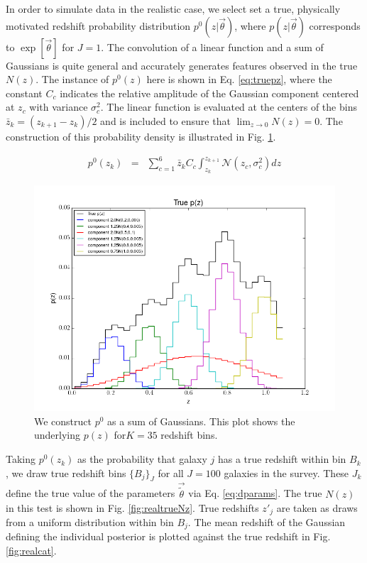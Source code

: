 \documentclass[preprint]{aastex}
\begin{document}
In order to simulate data in the realistic case, we select set a true, physically motivated redshift probability distribution $p^{0}(z|\vec{\theta})$, where $p(z|\vec{\theta})$ corresponds to $\exp[\vec{\theta}]$ for $J=1$.  The convolution of a linear function and a sum of Gaussians is quite general and accurately generates features observed in the true $N(z)$.  The instance of $p^{0}(z)$ here is shown in Eq. \ref{eq:truepz}, where the constant $C_{c}$ indicates the relative amplitude of the Gaussian component centered at $z_{c}$ with variance $\sigma_{c}^{2}$.  The linear function is evaluated at the centers of the bins $\bar{z}_{k}=(z_{k+1}-z_{k})/2$ and is included to ensure that $\lim_{z\to0}N(z)=0$.  The construction of this probability density is illustrated in Fig. \ref{fig:truepz}.  %

\begin{eqnarray}
\label{eq:truepz}
p^{0}(z_{k}) &=& \sum_{c=1}^{6}\bar{z}_{k}C_{c}\int_{z_{k}}^{z_{k+1}} \mathcal{N}(z_{c},\sigma^{2}_{c})dz
\end{eqnarray}

\begin{figure}
\includegraphics[width=\textwidth]{truePz.png}
\caption{We construct $p^{0}$ as a sum of Gaussians.  This plot shows the underlying $p(z)$ for$K=35$ redshift bins.}
\label{fig:truepz}
\end{figure}

Taking $p^{0}(z_{k})$ as the probability that galaxy $j$ has a true redshift within bin $B_{k}$, we draw true redshift bins $\{B_{j}\}_{J}$ for all $J=100$ galaxies in the survey.  These $J_{k}$ define the true value of the parameters $\vec{\tilde{\theta}}$ via Eq. \ref{eq:dparams}.  The true $N(z)$ in this test is shown in Fig. \ref{fig:realtrueNz}.  True redshifts $z'_{j}$ are taken as draws from a uniform distribution within bin $B_{j}$.  The mean redshift of the Gaussian defining the individual posterior is plotted against the true redshift in Fig. \ref{fig:realcat}.
\end{document}
